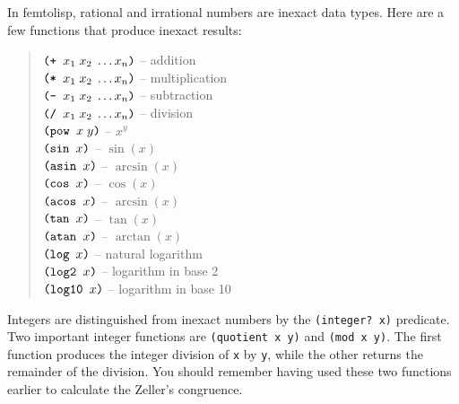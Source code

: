 \documentclass[a4paper,12pt]{book}
\begin{document}
In femtolisp, rational and irrational numbers
are inexact data types. Here are a few functions
that produce inexact results:
\begin{quote}
$\verb|(+ |x_1\;x_2\;\ldots x_n\verb|)|$ -- addition\\
$\verb|(* |x_1\;x_2\;\ldots x_n\verb|)|$ -- multiplication\\
$\verb|(- |x_1\;x_2\;\ldots x_n\verb|)|$ -- subtraction\\
$\verb|(/ |x_1\;x_2\;\ldots x_n\verb|)|$ -- division\\
$\verb|(pow |x\;y\verb|)|$ -- $x^y$\\
$\verb|(sin | x \verb|)|$ -- $\sin(x)$\\
$\verb|(asin | x \verb|)|$ -- $\arcsin(x)$\\
$\verb|(cos | x \verb|)|$ -- $\cos(x)$\\
$\verb|(acos | x \verb|)|$ -- $\arcsin(x)$\\ 
$\verb|(tan | x \verb|)|$ -- $\tan(x)$\\
$\verb|(atan | x \verb|)|$ -- $\arctan(x)$\\
$\verb|(log | x \verb|)|$ -- natural logarithm\\
$\verb|(log2 | x \verb|)|$ -- logarithm in base 2\\
$\verb|(log10 | x \verb|)|$ -- logarithm in base 10
\end{quote}
Integers are distinguished from inexact numbers
by the \verb|(integer? x)| predicate. Two important
integer functions are \verb|(quotient x y)| and
\verb|(mod x y)|. The first function
produces the integer division of \verb|x|
by \verb|y|, while the other returns
the remainder of the division. You should remember
having used
these two functions earlier to calculate the Zeller's
congruence.
\end{document}
